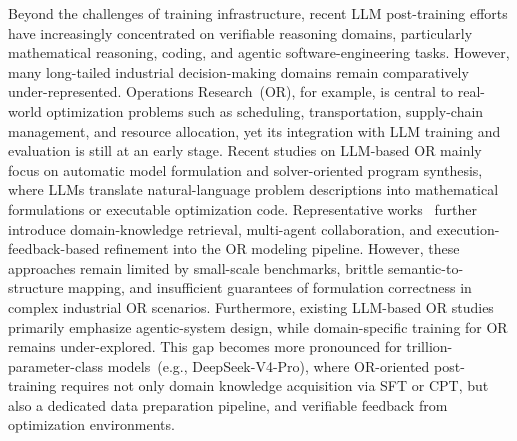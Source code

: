 Beyond the challenges of training infrastructure, recent LLM post-training efforts have increasingly concentrated on verifiable reasoning domains, particularly mathematical reasoning, coding, and agentic software-engineering tasks. However, many long-tailed industrial decision-making domains remain comparatively under-represented. Operations Research~(OR), for example, is central to real-world optimization problems such as scheduling, transportation, supply-chain management, and resource allocation, yet its integration with LLM training and evaluation is still at an early stage. 
Recent studies on LLM-based OR mainly focus on automatic model formulation and solver-oriented program synthesis, where LLMs translate natural-language problem descriptions into mathematical formulations or executable optimization code. Representative works~\citep{xiao2024chain,zhang2025or} further introduce domain-knowledge retrieval, multi-agent collaboration, and execution-feedback-based refinement into the OR modeling pipeline. However, these approaches remain limited by small-scale benchmarks, brittle semantic-to-structure mapping, and insufficient guarantees of formulation correctness in complex industrial OR scenarios.
Furthermore, existing LLM-based OR studies primarily emphasize agentic-system design, while domain-specific training for OR remains under-explored. This gap becomes more pronounced for trillion-parameter-class models~(e.g., DeepSeek-V4-Pro), where OR-oriented post-training requires not only domain knowledge acquisition via SFT or CPT, but also a dedicated data preparation pipeline, and verifiable feedback from optimization environments. 

